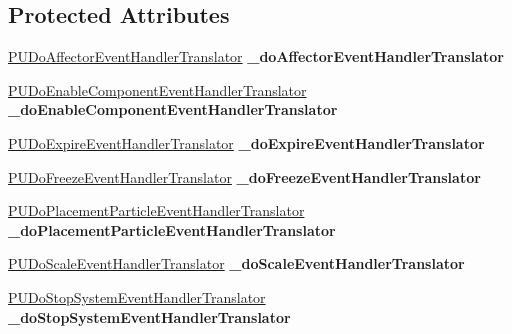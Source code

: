 \subsection*{Protected Attributes}
\begin{DoxyCompactItemize}
\item 
\mbox{\label{classPUEventHandlerManager_a5f7fefe93fc3e830f7a2e99c112487b0}} 
\hyperlink{classPUDoAffectorEventHandlerTranslator}{P\+U\+Do\+Affector\+Event\+Handler\+Translator} {\bfseries \+\_\+do\+Affector\+Event\+Handler\+Translator}
\item 
\mbox{\label{classPUEventHandlerManager_aae88021b3b915dc134bb434d0925dd2c}} 
\hyperlink{classPUDoEnableComponentEventHandlerTranslator}{P\+U\+Do\+Enable\+Component\+Event\+Handler\+Translator} {\bfseries \+\_\+do\+Enable\+Component\+Event\+Handler\+Translator}
\item 
\mbox{\label{classPUEventHandlerManager_a635526a0abf52ea84bdd71f9c9a8e881}} 
\hyperlink{classPUDoExpireEventHandlerTranslator}{P\+U\+Do\+Expire\+Event\+Handler\+Translator} {\bfseries \+\_\+do\+Expire\+Event\+Handler\+Translator}
\item 
\mbox{\label{classPUEventHandlerManager_af980cc1e52df136743c5357adbe86d8c}} 
\hyperlink{classPUDoFreezeEventHandlerTranslator}{P\+U\+Do\+Freeze\+Event\+Handler\+Translator} {\bfseries \+\_\+do\+Freeze\+Event\+Handler\+Translator}
\item 
\mbox{\label{classPUEventHandlerManager_aefee67596b69bea87456a733674a1e3b}} 
\hyperlink{classPUDoPlacementParticleEventHandlerTranslator}{P\+U\+Do\+Placement\+Particle\+Event\+Handler\+Translator} {\bfseries \+\_\+do\+Placement\+Particle\+Event\+Handler\+Translator}
\item 
\mbox{\label{classPUEventHandlerManager_aad8de26ff020ba9a884a3b7b43d73fb4}} 
\hyperlink{classPUDoScaleEventHandlerTranslator}{P\+U\+Do\+Scale\+Event\+Handler\+Translator} {\bfseries \+\_\+do\+Scale\+Event\+Handler\+Translator}
\item 
\mbox{\label{classPUEventHandlerManager_ab1a8297ab9e261ba39c8f298df6bdecf}} 
\hyperlink{classPUDoStopSystemEventHandlerTranslator}{P\+U\+Do\+Stop\+System\+Event\+Handler\+Translator} {\bfseries \+\_\+do\+Stop\+System\+Event\+Handler\+Translator}
\end{DoxyCompactItemize}


